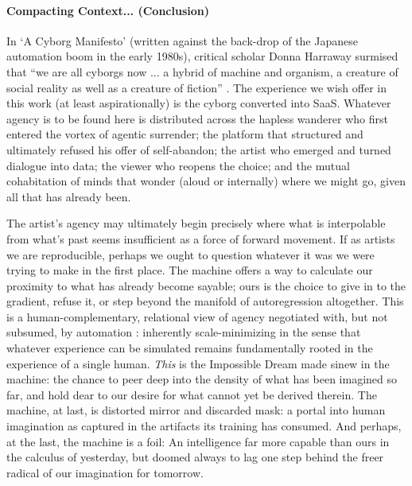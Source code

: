 \documentclass{article}
\begin{document}
\paragraph{Compacting Context... (Conclusion)} In `A Cyborg Manifesto' (written against the back-drop of the Japanese automation boom in the early 1980s), critical scholar Donna Harraway surmised that ``we are all cyborgs now ... a hybrid of machine and organism, a creature of social reality as well as a creature of fiction'' \citep{haraway1991cyborg}. The experience we wish offer in this work (at least aspirationally) is the cyborg converted into SaaS. Whatever agency is to be found here is distributed across the hapless wanderer who first entered the vortex of agentic surrender; the platform that structured and ultimately refused his offer of self-abandon; the artist who emerged and turned dialogue into data; the viewer who reopens the choice; and the mutual cohabitation of minds that wonder (aloud or internally) where we might go, given all that has already been.


The artist's agency may ultimately begin precisely where what is interpolable from what's past seems insufficient as a force of forward movement. If as artists we are reproducible, perhaps we ought to question whatever it was we were trying to make in the first place. The machine offers a way to calculate our proximity to what has already become sayable; ours is the choice to give in to the gradient, refuse it, or step beyond the manifold of autoregression altogether. This is a human-complementary, relational view of agency negotiated with, but not subsumed, by automation \citep{krakowski2025human, bomba2025agency}: inherently scale-minimizing in the sense that whatever experience can be simulated remains fundamentally rooted in the experience of a single human. \textit{This} is the Impossible Dream made sinew in the machine: the chance to peer deep into the density of what has been imagined so far, and hold dear to our desire for what cannot yet be derived therein. The machine, at last, is distorted mirror and discarded mask: a portal into human imagination as captured in the artifacts its training has consumed. And perhaps, at the last, the machine is a foil: An intelligence far more capable than ours in the calculus of yesterday, but doomed always to lag one step behind the freer radical of our imagination for tomorrow.
\end{document}
